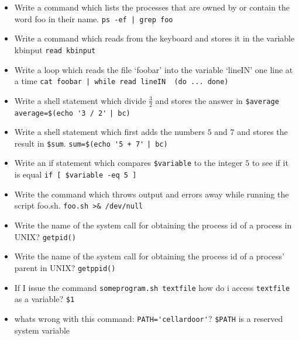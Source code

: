 \documentclass[10pt,landscape]{article}
\begin{document}
\begin{multicols}{4}
\begin{itemize}
    \item Write a command which lists the processes that are owned by or contain the word foo in their name. \verb$ps -ef | grep foo$
    \item Write a command which reads from the keyboard and stores it in the variable kbinput \verb$read kbinput$
    \item  Write a loop which reads the file `foobar' into the variable `lineIN' one line at a time
    \verb$cat foobar | while read lineIN  (do ... done)$
    \item Write a shell statement which divide $\frac{3}{2}$ and stores the answer in \verb|$average| \verb|average=$(echo '3 / 2'| \verb$| bc)$
    \item Write a shell statement which first adds the numbers $5$ and $7$ and stores the result in \verb|$sum|. \verb|sum=$(echo '5 + 7'| \verb$| bc)$
    \item Write an if statement which compares \verb|$variable| to the integer $5$ to see if it is equal \verb|if [ $variable -eq 5 ]|
    \item Write the command which throws output and errors away while running the script foo.sh. \verb|foo.sh >& /dev/null|
    \item Write the name of the system call for obtaining the process id of a process in UNIX? \verb$getpid()$
    \item Write the name of the system call for obtaining the process id of a process' parent in UNIX?  \verb|getppid()|
    \item If I issue the command \verb$someprogram.sh textfile$ how do i access \verb$textfile$ as a variable? \verb|$1|
    \item whats wrong with this command: \verb$PATH='cellardoor'$? \verb|$PATH| is a reserved system variable
\end{itemize}

\end{multicols}
\end{document}
